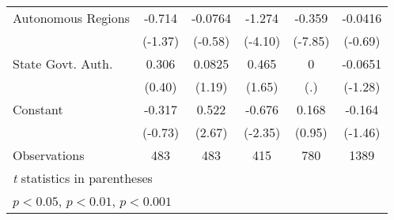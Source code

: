\begin{table}[htbp]
\begin{tabular}{l*{5}{c}}
\addlinespace
Autonomous Regions                      &   -0.714         &  -0.0764         &   -1.274\sym{***}&   -0.359\sym{***}&  -0.0416         \\
                                        &  (-1.37)         &  (-0.58)         &  (-4.10)         &  (-7.85)         &  (-0.69)         \\
\addlinespace
State Govt. Auth.                       &    0.306         &   0.0825         &    0.465         &        0         &  -0.0651         \\
                                        &   (0.40)         &   (1.19)         &   (1.65)         &      (.)         &  (-1.28)         \\
\addlinespace
Constant                                &   -0.317         &    0.522\sym{**} &   -0.676\sym{*}  &    0.168         &   -0.164         \\
                                        &  (-0.73)         &   (2.67)         &  (-2.35)         &   (0.95)         &  (-1.46)         \\
\midrule
Observations                            &      483         &      483         &      415         &      780         &     1389         \\
\bottomrule
\multicolumn{6}{l}{\footnotesize \textit{t} statistics in parentheses}\\
\multicolumn{6}{l}{\footnotesize \sym{*} \(p<0.05\), \sym{**} \(p<0.01\), \sym{***} \(p<0.001\)}\\
\end{tabular}
\end{table}
